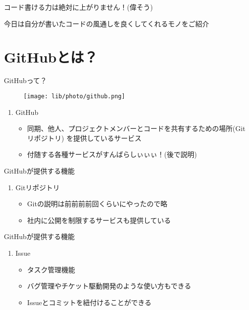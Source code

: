 \documentclass[dvipdfmx]{beamer}
\begin{document}
\begin{frame}
\begin{center}

\begin{Huge}
コード書ける力は絶対に上がりません！(偉そう)
\end{Huge}
\end{center}
\end{frame}

\begin{frame}
\Large{今日は自分が書いたコードの風通しを良くしてくれるモノをご紹介}
\end{frame}


\section{GitHubとは？}
\begin{frame}{GitHubって？}
\begin{figure}
\texttt{[image: lib/photo/github.png]}
\end{figure}
\begin{enumerate}
\item \Large{GitHub}

\begin{itemize}
\item 同期、他人、プロジェクトメンバーとコードを共有するための場所(Gitリポジトリ)
を提供しているサービス
\vspace{1cm}
\item 付随する各種サービスがすんばらしぃぃぃ！(後で説明)
\end{itemize}

\end{enumerate}
\end{frame}

\begin{frame}{GitHubが提供する機能}

\begin{enumerate}
\item \Large{Gitリポジトリ}
\begin{itemize}
\item Gitの説明は前前前前回くらいにやったので略
\vspace{1cm}
\item 社内に公開を制限するサービスも提供している
\end{itemize}
\end{enumerate}
\end{frame}

\begin{frame}{GitHubが提供する機能}
\begin{enumerate}
\item \Large{Issue}
\begin{itemize}
\item タスク管理機能
\vspace{1cm}
\item バグ管理やチケット駆動開発のような使い方もできる
\vspace{1cm}
\item Issueとコミットを紐付けることができる
\end{itemize}
\end{enumerate}
\end{frame}
\end{document}
